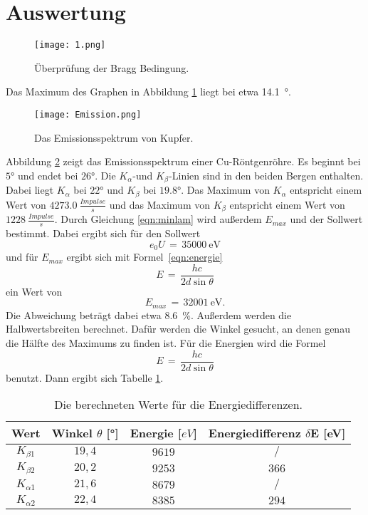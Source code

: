 \documentclass[
  bibliography=totoc,     %
  captions=tableheading,  %
  titlepage=firstiscover, %
]{scrartcl}
\begin{document}
\section{Auswertung}
\label{sec:auswertung}
\begin{figure}[H]
  \centering
  \texttt{[image: 1.png]}
  \caption{Überprüfung der Bragg Bedingung.}
  \label{fig:6025}
\end{figure}
Das Maximum des Graphen in Abbildung \ref{fig:6025} liegt bei etwa \SI{14.1}{°}.
\begin{figure}[H]
  \centering
  \texttt{[image: Emission.png]}
  \caption{Das Emissionsspektrum von Kupfer.}
  \label{fig:60211}
\end{figure}
\noindent
Abbildung \ref{fig:60211} zeigt das Emissionsspektrum einer Cu-Röntgenröhre. Es beginnt bei $5°$ und endet bei $26°$. Die $K_{\alpha}$-und $K_{\beta}$-Linien sind in den beiden Bergen enthalten. Dabei liegt $K_{\alpha}$ bei $22°$ und $K_{\beta}$ bei $19.8°$. Das Maximum von $K_{\alpha}$ entspricht einem Wert von $\SI{4273.0}{\frac{Impulse}{s}}$ und das Maximum von $K_{\beta}$ entspricht
einem Wert von $\SI{1228}{\frac{Impulse}{s}}$. Durch Gleichung \eqref{eqn:minlam} wird außerdem $E_{max}$ und der Sollwert bestimmt. Dabei ergibt sich für den Sollwert
\begin{equation*}
  e_0 U\,=\,\SI{35000}{\electronvolt}
\end{equation*}
und für $E_{max}$ ergibt sich mit Formel~\eqref{eqn:energie}
\begin{equation}
  E\,=\,\frac{hc}{2d\sin\theta}
  \label{eqn:energie}
\end{equation}
ein Wert von
\begin{equation*}
  E_{max}\,=\,\SI{32001}{\electronvolt}.
\end{equation*}
Die Abweichung beträgt dabei etwa \SI{8.6}{\percent}. Außerdem werden die Halbwertsbreiten berechnet. Dafür werden die Winkel gesucht, an denen genau die Hälfte des Maximums zu finden ist. Für die Energien wird die Formel
\begin{equation}
  E\,=\,\frac{hc}{2d\sin\theta}
\end{equation}
benutzt. Dann ergibt sich Tabelle \ref{tab:energiedifferenzen}.
\begin{table}[H]
	\begin{center}
	\caption{Die berechneten Werte für die Energiedifferenzen.}
	\label{tab:energiedifferenzen}
		\begin{tabular}{cccc}
			\toprule
			{Wert} & {Winkel $\theta$ [°]} & {Energie [$eV$]}
      & {Energiedifferenz $\delta$E [eV]}\\
			\midrule
      $K_{\beta 1}$ & $19,4$ & $9619$ & $/$ \\
			$K_{\beta 2}$ & $20,2$ & $9253$ & $366$ \\
			$K_{\alpha 1}$ & $21,6$ & $8679$ & $/$\\
			$K_{\alpha 2}$ & $22,4$ & $8385$ & $294$ \\
			\bottomrule
		\end{tabular}
	\end{center}
\end{table}
\end{document}
